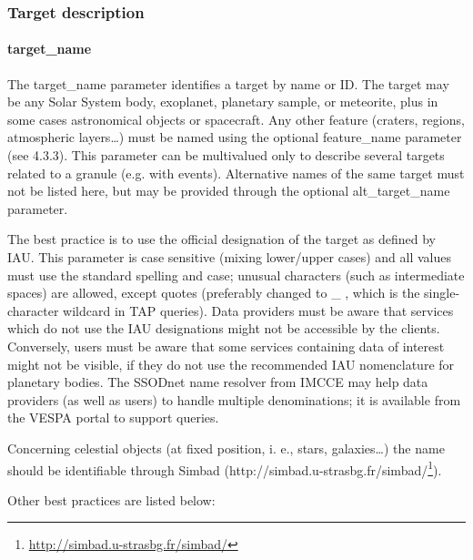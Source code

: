 \documentclass[11pt,a4paper]{ivoa}
\begin{document}
\subsubsection{Target description}

\paragraph{target\_name}

The target\_name parameter identifies a target by name or ID. The target may be any Solar System body, exoplanet, planetary sample, or meteorite, plus in some cases astronomical objects or spacecraft. Any other feature (craters, regions, atmospheric layers…) must be named using the optional feature\_name parameter (see 4.3.3). This parameter can be multivalued only to describe several targets related to a granule (e.g. with events). Alternative names of the same target must not be listed here, but may be provided through the optional alt\_target\_name parameter. 

The best practice is to use the official designation of the target as defined by IAU. This parameter is case sensitive (mixing lower/upper cases) and all values must use the standard spelling and case; unusual characters (such as intermediate spaces) are allowed, except quotes (preferably changed to \_ , which is the single-character wildcard in TAP queries). Data providers must be aware that services which do not use the IAU designations might not be accessible by the clients. Conversely, users must be aware that some services containing data of interest might not be visible, if they do not use the recommended IAU nomenclature for planetary bodies. The SSODnet name resolver from IMCCE may help data providers (as well as users) to handle multiple denominations; it is available from the VESPA portal to support queries.

Concerning celestial objects (at fixed position, i. e., stars, galaxies…) the name should be identifiable through Simbad (http://simbad.u-strasbg.fr/simbad/\footnote{\url{http://simbad.u-strasbg.fr/simbad/}}).

Other best practices are listed below:
\end{document}
